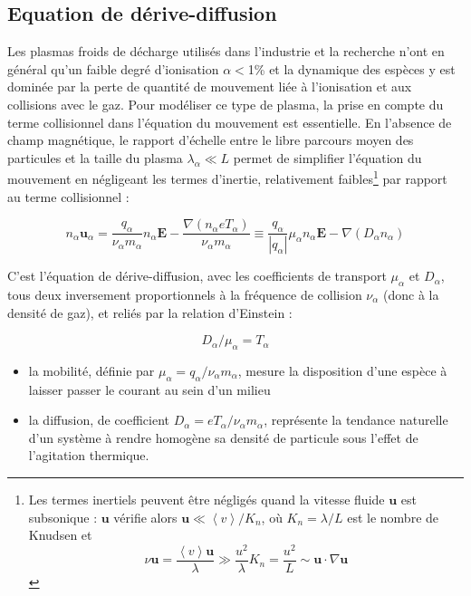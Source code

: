 \begin{refsection}
\subsection{Equation de dérive-diffusion}
\label{1-transportAmbipolaire}
Les plasmas froids de décharge utilisés dans l'industrie et la recherche n'ont
en général qu'un faible degré d'ionisation $\alpha<$1\% et la dynamique des
espèces y est dominée par la perte de quantité de mouvement liée à l'ionisation
et aux collisions avec le gaz. Pour modéliser ce type de plasma, la prise en
compte du terme collisionnel dans l'équation du mouvement est essentielle.
En l'absence de champ magnétique, le rapport d'échelle entre le libre parcours moyen des particules
et la taille du plasma $\lambda_\alpha\ll L$ permet de simplifier l'équation du
mouvement en négligeant les termes d'inertie, relativement faibles\footnote{Les
termes inertiels peuvent être négligés quand la vitesse fluide $\mathbf u$ est
subsonique : $\mathbf u$ vérifie alors $\mathbf u\ll \left<v\right>/K_n$, où
$K_n=\lambda/L$ est le nombre de Knudsen et $$\nu \mathbf u=\frac{
\left<v\right>\mathbf u}{\lambda}\gg \frac{u^2}{\lambda}K_n=\frac{u^2}{L}\sim
\mathbf u\cdot\nabla\mathbf u$$} par rapport au terme collisionnel :

\begin{equation}
\label{1-eqDriftDif}
n_\alpha\mathbf u_\alpha=\frac{q_\alpha}{\nu_\alpha m_\alpha}n_\alpha\mathbf
E-\frac{\nabla\left(n_\alpha eT_\alpha\right)}{\nu_\alpha
m_\alpha}\equiv\frac{q_\alpha}{|q_\alpha|}\mu_\alpha n_\alpha\mathbf
E-{\nabla\left(D_\alpha n_\alpha\right)}
\end{equation}

C'est l'équation de dérive-diffusion, avec les coefficients de
transport $\mu_\alpha$ et $D_\alpha$, tous deux
inversement proportionnels à la fréquence de collision $\nu_\alpha$ (donc à la
densité de gaz), et reliés par la relation d'Einstein :

\begin{equation}
\label{1-EinsteinRelation}
D_\alpha/\mu_\alpha=T_\alpha
\end{equation}

\begin{itemize}
  \item la mobilité, définie par $\mu_\alpha=q_\alpha/\nu_\alpha m_\alpha$,
  mesure la disposition d'une espèce à laisser passer le courant au sein d'un milieu
  \item la diffusion, de coefficient $D_\alpha=eT_\alpha/\nu_\alpha m_\alpha$,
  représente la tendance naturelle d'un système à rendre homogène sa densité de particule sous l'effet
  de l'agitation thermique.
\end{itemize}


\end{refsection}
